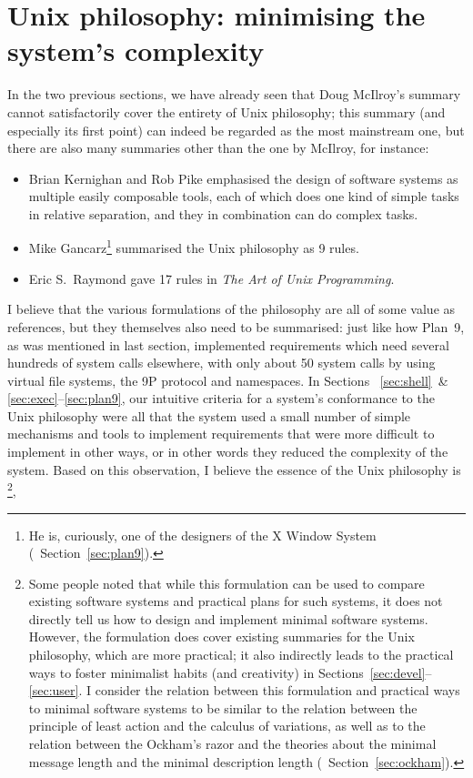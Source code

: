 \section{Unix philosophy: minimising the system's complexity}\label{sec:complex}

In the two previous sections, we have already seen that Doug McIlroy's
summary cannot satisfactorily cover the entirety of Unix philosophy;
this summary (and especially its first point) can indeed be regarded as
the most mainstream one, but there are also many summaries other than
the one by McIlroy, for instance:
\begin{itemize}
\item Brian Kernighan and Rob Pike emphasised the design of software systems as
	multiple easily composable tools, each of which does one kind of simple
	tasks in relative separation, and they in combination can do complex tasks.
\item Mike Gancarz\footnote{He is, curiously, one of the designers of the
	X Window System (\cf~Section~\ref{sec:plan9}).} summarised
	the Unix philosophy as 9 rules.
\item Eric S.\ Raymond gave 17 rules in \emph{The Art of Unix Programming}.
\end{itemize}
I believe that the various formulations of the philosophy are all of some value
as references, but they themselves also need to be summarised: just like how
Plan~9, as was mentioned in last section, implemented requirements which need
several hundreds of system calls elsewhere, with only about 50 system calls
by using virtual file systems, the 9P protocol and namespaces.  In Sections~%
\ref{sec:shell}~\& \ref{sec:exec}--\ref{sec:plan9}, our intuitive criteria
for a system's conformance to the Unix philosophy were all that the system
used a small number of simple mechanisms and tools to implement requirements
that were more difficult to implement in other ways, or in other words they
reduced the complexity of the system.  Based on this observation, I believe
the essence of the Unix philosophy is \footnote%
{Some people noted that while this formulation can be used to compare existing
software systems and practical plans for such systems, it does not directly
tell us how to design and implement minimal software systems.  However, the
formulation does cover existing summaries for the Unix philosophy, which
are more practical; it also indirectly leads to the practical ways to foster
minimalist habits (and creativity) in Sections~\ref{sec:devel}--\ref{sec:user}.
I consider the relation between this formulation and practical ways to minimal
software systems to be similar to the relation between the principle of least
action and the calculus of variations, as well as to the relation between
the Ockham's razor and the theories about the minimal message length
and the minimal description length (\cf~Section~\ref{sec:ockham}).},
